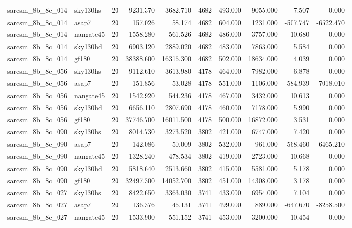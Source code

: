\begin{tabular}{llrrrrrrrr}
sarcsm\_8b\_8c\_014 & sky130hs & 20 & 9231.370 & 3682.710 & 4682 & 493.000 & 9055.000 & 7.507 & 0.000 \\
sarcsm\_8b\_8c\_014 & asap7 & 20 & 157.026 & 58.174 & 4682 & 604.000 & 1231.000 & -507.747 & -6522.470 \\
sarcsm\_8b\_8c\_014 & nangate45 & 20 & 1558.280 & 561.526 & 4682 & 486.000 & 3757.000 & 10.680 & 0.000 \\
sarcsm\_8b\_8c\_014 & sky130hd & 20 & 6903.120 & 2889.020 & 4682 & 483.000 & 7863.000 & 5.584 & 0.000 \\
sarcsm\_8b\_8c\_014 & gf180 & 20 & 38388.600 & 16316.300 & 4682 & 502.000 & 18634.000 & 4.039 & 0.000 \\
sarcsm\_8b\_8c\_056 & sky130hs & 20 & 9112.610 & 3613.980 & 4178 & 464.000 & 7982.000 & 6.878 & 0.000 \\
sarcsm\_8b\_8c\_056 & asap7 & 20 & 151.856 & 53.028 & 4178 & 551.000 & 1106.000 & -584.939 & -7018.010 \\
sarcsm\_8b\_8c\_056 & nangate45 & 20 & 1542.920 & 544.236 & 4178 & 467.000 & 3432.000 & 10.613 & 0.000 \\
sarcsm\_8b\_8c\_056 & sky130hd & 20 & 6656.110 & 2807.690 & 4178 & 460.000 & 7178.000 & 5.990 & 0.000 \\
sarcsm\_8b\_8c\_056 & gf180 & 20 & 37746.700 & 16011.500 & 4178 & 500.000 & 16872.000 & 3.531 & 0.000 \\
sarcsm\_8b\_8c\_090 & sky130hs & 20 & 8014.730 & 3273.520 & 3802 & 421.000 & 6747.000 & 7.420 & 0.000 \\
sarcsm\_8b\_8c\_090 & asap7 & 20 & 142.086 & 50.009 & 3802 & 532.000 & 961.000 & -568.460 & -6465.210 \\
sarcsm\_8b\_8c\_090 & nangate45 & 20 & 1328.240 & 478.534 & 3802 & 419.000 & 2723.000 & 10.668 & 0.000 \\
sarcsm\_8b\_8c\_090 & sky130hd & 20 & 5818.640 & 2513.660 & 3802 & 415.000 & 5581.000 & 5.178 & 0.000 \\
sarcsm\_8b\_8c\_090 & gf180 & 20 & 32497.300 & 14052.700 & 3802 & 451.000 & 14308.000 & 3.178 & 0.000 \\
sarcsm\_8b\_8c\_027 & sky130hs & 20 & 8422.650 & 3363.030 & 3741 & 433.000 & 6954.000 & 7.104 & 0.000 \\
sarcsm\_8b\_8c\_027 & asap7 & 20 & 136.376 & 46.131 & 3741 & 499.000 & 889.000 & -647.670 & -8258.500 \\
sarcsm\_8b\_8c\_027 & nangate45 & 20 & 1533.900 & 551.152 & 3741 & 453.000 & 3200.000 & 10.454 & 0.000 \\

\end{tabular}
